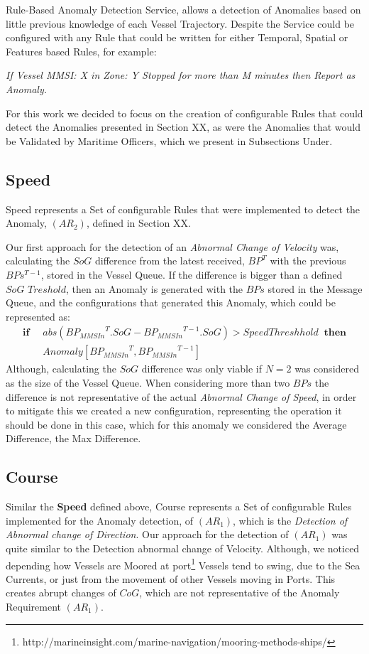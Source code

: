 Rule-Based Anomaly Detection Service, allows a detection of Anomalies based on little previous knowledge of each Vessel Trajectory. Despite the Service could be configured with any Rule that could be written for either Temporal, Spatial or Features based Rules, for example:

\textit{If Vessel MMSI: X in Zone: Y Stopped for more than M minutes then Report as Anomaly.}

For this work we decided to focus on the creation of configurable Rules that could detect the Anomalies presented in Section XX, as were the Anomalies that would be Validated by Maritime Officers,  which we present in Subsections Under.

\subsection{Speed}
\label{subsection: 4 Speed}
Speed represents a Set of configurable Rules that were implemented to detect the Anomaly, $(AR_2)$, defined in Section XX.

Our first approach for the detection of an \textit{Abnormal Change of Velocity} was, calculating the $SoG$ difference from the latest received, $BP^T$ with the previous $BPs^{T-1}$, stored in the Vessel Queue.
If the difference is bigger than a defined $SoG$ $Treshold$, then an Anomaly is generated with the $BPs$ stored in the Message Queue, and the configurations that generated this Anomaly, which could be represented as:
\begin{align*}
\mathbf{if}\;\;& abs({BP_{MMSIn}}^{T}.SoG - {BP_{MMSIn}}^{T-1}.SoG) > SpeedThreshhold
\;\;\mathbf{then} \\ 
&Anomaly[{BP_{MMSIn}}^{T}, {BP_{MMSIn}}^{T-1}] 
\end{align*}
Although, calculating the $SoG$ difference was only viable if  $N = 2 $ was considered as the size of the Vessel Queue.
When considering more than two $BPs$ the difference is not representative of the actual \textit{Abnormal Change of Speed}, in order to mitigate this we created a new configuration, representing the operation it should be done in this case, which for this anomaly we considered the Average Difference, the Max Difference.

\subsection{Course}
\label{subsection: 4 Course}
Similar the \textbf{Speed} defined above, Course represents a Set of configurable Rules implemented for the Anomaly detection, of $(AR_1)$, which is the \textit{Detection of Abnormal change of Direction}. 
Our approach for the detection of $(AR_1)$ was quite similar to the {Detection abnormal change of Velocity}. 
Although, we noticed depending how Vessels are Moored at port\footnote{http://marineinsight.com/marine-navigation/mooring-methods-ships/}  Vessels tend to swing, due to the Sea Currents, or just from the movement of other Vessels moving in Ports. This creates abrupt changes of $CoG$, which are not representative of the Anomaly Requirement $(AR_1)$.

